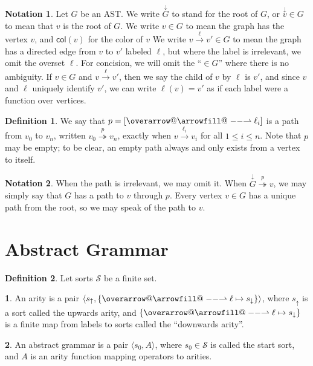\documentclass[11pt]{article} %
\makeatletter
\theoremstyle{definition}
\newtheorem{dfn}{Definition}
\newtheorem{subdfn}{\indent}[dfn]
\newtheorem*{ntn}{Notation}
\def\rightharpoonupfill@{\arrowfill@\relbar\relbar\rightharpoonup}
\newcommand{\harpvec}{%
   \mathpalette{\overarrow@\rightharpoonupfill@}}
\makeatother
\begin{document}
\begin{ntn}
Let $G$ be an AST.
We write $\overset{\downarrow}G$ to stand for the root of $G$, or $\overset{\downarrow}v \in G$ to mean that $v$ is the root of $G$.
We write $v \in G$ to mean the graph has the vertex $v$, and $\mathsf{col}(v)$ for the color of $v$
We write $v \overset{\ell}\to v' \in G$ to mean the graph has a directed edge from $v$ to $v'$ labeled $\ell$, but where the label is irrelevant, we omit the overset $\ell$.
For concision, we will omit the ``$\in G$'' where there is no ambiguity.
If $v \in G$ and $v \overset{\ell}\to v'$, then we say the child of $v$ by $\ell$ is $v'$, and since $v$ and $\ell$ uniquely identify $v'$, we can write $\ell(v) = v'$ as if each label were a function over vertices.
\end{ntn}

\begin{dfn}
We say that $p = [\harpvec{\ell_i}]$ is a path from $v_0$ to $v_n$, written $v_0 \overset{p}\twoheadrightarrow v_n$, exactly when $v \overset{\ell_i}\to v_i$ for all $1 \leq i \leq n$.
Note that $p$ may be empty; to be clear, an empty path always and only exists from a vertex to itself.
\end{dfn}

\begin{ntn}
When the path is irrelevant, we may omit it.
When $\overset{\downarrow}G \overset{p}\twoheadrightarrow v$, we may simply say that $G$ has a path to $v$ through $p$.
Every vertex $v \in G$ has a unique path from the root, so we may speak of the path to $v$.
\end{ntn}

\section{Abstract Grammar}

\begin{dfn}
Let sorts $\mathcal{S}$ be a finite set.
\begin{subdfn}
An arity is a pair $\langle s_\uparrow, \{\harpvec{\ell \mapsto s_\downarrow}\} \rangle$, where $s_\uparrow$ is a sort called the upwards arity, and $\{\harpvec{\ell \mapsto s_\downarrow}\}$ is a finite map from labels to sorts called the ``downwards arity''.
\end{subdfn}
\begin{subdfn}
An abstract grammar is a pair $\langle s_0, A \rangle$, where $s_0 \in \mathcal{S}$ is called the start sort, and $A$ is  an arity function mapping operators to arities.
\end{subdfn}
\end{dfn}
\end{document}
